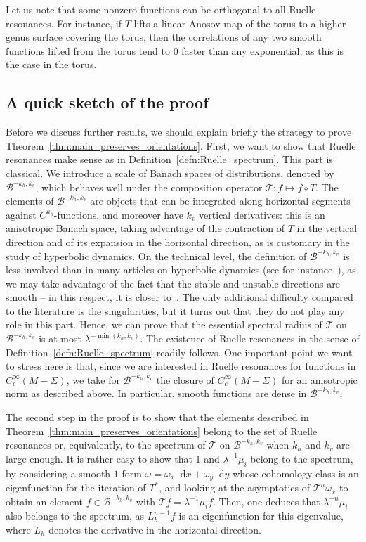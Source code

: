\documentclass[11pt, a4paper, oneside, final, pagebackref]{amsart}
\newcommand{\boB}{\mathcal{B}}
\newcommand{\boT}{\mathcal{T}}
\newcommand{\dd}{\mathop{}\!\mathrm{d}}
\theoremstyle{definition}
\numberwithin{equation}{section}
\begin{document}
Let us note that some nonzero functions can be orthogonal to all Ruelle resonances. For instance,
if $T$ lifts a linear Anosov map of the torus to a higher genus surface covering
the torus, then the correlations of any two smooth functions lifted from the torus
tend to $0$ faster than any exponential, as this is the case in the torus.

\subsection*{A quick sketch of the proof}
Before we discuss further results, we should explain briefly the strategy to
prove Theorem~\ref{thm:main_preserves_orientations}. First, we want to show
that Ruelle resonances make sense as in
Definition~\ref{defn:Ruelle_spectrum}. This part is classical. We introduce a
scale of Banach spaces of distributions, denoted by $\boB^{-k_h, k_v}$, which
behaves well under the composition operator $\boT : f \mapsto f \circ T$. The
elements of $\boB^{-k_h, k_v}$ are objects that can be integrated along
horizontal segments against $C^{k_h}$-functions, and moreover have $k_v$
vertical derivatives: this is an anisotropic Banach space, taking advantage
of the contraction of $T$ in the vertical direction and of its expansion in
the horizontal direction, as is customary in the study of hyperbolic
dynamics. On the technical level, the definition of $\boB^{-k_h, k_v}$ is
less involved than in many articles on hyperbolic dynamics (see for
instance~\cite{GL_Anosov2, bt_aniso}), as we may take advantage of the fact
that the stable and unstable directions are smooth -- in this respect, it is
closer to~\cite{baladi_Cinfty, avila_gouezel}. The only additional difficulty
compared to the literature is the singularities, but it turns out that they
do not play any role in this part. Hence, we can prove that the essential
spectral radius of $\boT$ on $\boB^{-k_h, k_v}$ is at most
$\lambda^{-\min(k_h, k_v)}$. The existence of Ruelle resonances in the sense
of Definition~\ref{defn:Ruelle_spectrum} readily follows. One important point
we want to stress here is that, since we are interested in Ruelle resonances
for functions in $C^\infty_c(M-\Sigma)$, we take for $\boB^{-k_h, k_v}$ the
closure of $C^\infty_c(M-\Sigma)$ for an anisotropic norm as described above.
In particular, smooth functions are dense in $\boB^{-k_h, k_v}$.

The second step in the proof is to show that the elements described in
Theorem~\ref{thm:main_preserves_orientations} belong to the set of Ruelle
resonances or, equivalently, to the spectrum of $\boT$ on $\boB^{-k_h, k_v}$
when $k_h$ and $k_v$ are large enough. It is rather easy to show that $1$ and
$\lambda^{-1} \mu_i$ belong to the spectrum, by considering a smooth $1$-form
$\omega = \omega_x \dd x + \omega_y \dd y$ whose cohomology class is an
eigenfunction for the iteration of $T^*$, and looking at the asymptotics of
$\boT^n \omega_x$ to obtain an element $f\in \boB^{-k_h, k_v}$ with $\boT f =
\lambda^{-1} \mu_i f$. Then, one deduces that $\lambda^{-n} \mu_i$ also
belongs to the spectrum, as $L_h^{n-1} f$ is an eigenfunction for this
eigenvalue, where $L_h$ denotes the derivative in the horizontal direction.
\end{document}
